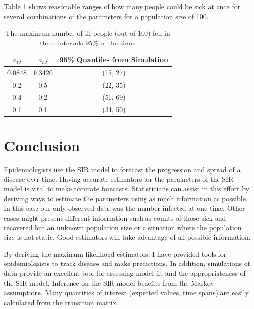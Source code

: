 \documentclass{svproc}
\begin{document}
Table \ref{tab3} shows reasonable ranges of how many people could be sick at once for several combinations of the parameters for a population size of 100. 
\begin{table}
\centering
\setlength{\tabcolsep}{5pt}
\begin{tabular}{|c|c|c|}

\hline
$a_{12}$ & $a_{32}$ & 95\% Quantiles from Simulation \\ \hline
0.0848 & 0.3420 & (15, 27) \\ \hline
0.2 & 0.5 & (22, 35) \\ \hline
0.4 & 0.2 & (51, 69) \\ \hline
0.1 & 0.1 & (34, 50) \\ \hline

\end{tabular}
\caption{The maximum number of ill people (out of 100) fell in these intervals 95\% of the time.}
\label{tab3}
\end{table}

\section{Conclusion}
Epidemiologists use the SIR model to forecast the progression and spread of a disease over time. Having accurate estimators for the parameters of the SIR model is vital to make accurate forecasts. Statisticians can assist in this effort by deriving ways to estimate the parameters using as much information as possible. In this case our only observed data was the number infected at one time. Other cases might present different information such as counts of those sick and recovered but an unknown population size or a situation where the population size is not static. Good estimators will take advantage of all possible information. 

By deriving the maximum likelihood estimators, I have provided tools for epidemiologists to track disease and make predictions. In addition, simulations of data provide an excellent tool for assessing model fit and the appropriateness of the SIR model. Inference on the SIR model benefits from the Markov assumptions. Many quantities of interest (expected values, time spans) are easily calculated from the transition matrix. 

\nocite{*}


\end{document}
